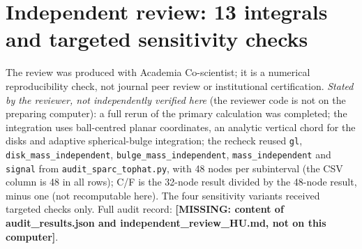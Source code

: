 \documentclass[10pt,a4paper]{article}
\newcommand{\missing}[1]{\textcolor{red!70!black}{\textbf{[MISSING: #1]}}}
\begin{document}
\section{\texorpdfstring{Independent review: 13 integrals and targeted sensitivity checks}{Independent review: 13 integrals and targeted sensitivity checks}}
The review was produced with Academia Co-scientist; it is a numerical reproducibility check, not journal peer review or institutional certification. \emph{Stated by the reviewer, not independently verified here} (the reviewer code is not on the preparing computer): a full rerun of the primary calculation was completed; the integration uses ball-centred planar coordinates, an analytic vertical chord for the disks and adaptive spherical-bulge integration; the recheck reused \texttt{gl}, \texttt{disk\_mass\_independent}, \texttt{bulge\_mass\_independent}, \texttt{mass\_independent} and \texttt{signal} from \texttt{audit\_sparc\_tophat.py}, with 48 nodes per subinterval (the CSV column is 48 in all rows); C/F is the 32-node result divided by the 48-node result, minus one (not recomputable here). The four sensitivity variants received targeted checks only. Full audit record: \missing{content of audit\_results.json and independent\_review\_HU.md, not on this computer}.
\end{document}

